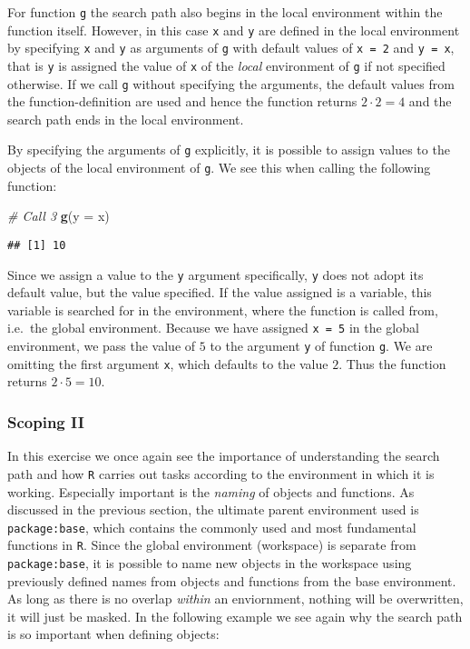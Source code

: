 \documentclass[11,]{article}
\newenvironment{Shaded}{\begin{snugshade}}{\end{snugshade}}
\newcommand{\KeywordTok}[1]{\textcolor[rgb]{0.13,0.29,0.53}{\textbf{{#1}}}}
\newcommand{\DataTypeTok}[1]{\textcolor[rgb]{0.13,0.29,0.53}{{#1}}}
\newcommand{\CommentTok}[1]{\textcolor[rgb]{0.56,0.35,0.01}{\textit{{#1}}}}
\newcommand{\NormalTok}[1]{{#1}}
\begin{document}
For function \texttt{g} the search path also begins in the local
environment within the function itself. However, in this case \texttt{x}
and \texttt{y} are defined in the local environment by specifying
\texttt{x} and \texttt{y} as arguments of \texttt{g} with default values
of \texttt{x\ =\ 2} and \texttt{y\ =\ x}, that is \texttt{y} is assigned
the value of \texttt{x} of the \emph{local} environment of \texttt{g} if
not specified otherwise. If we call \texttt{g} without specifying the
arguments, the default values from the function-definition are used and
hence the function returns \(2 \cdot 2=4\) and the search path ends in
the local environment.

By specifying the arguments of \texttt{g} explicitly, it is possible to
assign values to the objects of the local environment of \texttt{g}. We
see this when calling the following function:

\begin{Shaded}
\begin{Highlighting}[]
\CommentTok{# Call 3}
\KeywordTok{g}\NormalTok{(}\DataTypeTok{y =} \NormalTok{x)}
\end{Highlighting}
\end{Shaded}

\begin{verbatim}
## [1] 10
\end{verbatim}

Since we assign a value to the \texttt{y} argument specifically,
\texttt{y} does not adopt its default value, but the value specified. If
the value assigned is a variable, this variable is searched for in the
environment, where the function is called from, i.e.~the global
environment. Because we have assigned \texttt{x\ =\ 5} in the global
environment, we pass the value of \(5\) to the argument \texttt{y} of
function \texttt{g}. We are omitting the first argument \texttt{x},
which defaults to the value \(2\). Thus the function returns
\(2 \cdot 5=10\).

\subsubsection{Scoping II}\label{scoping-ii}

In this exercise we once again see the importance of understanding the
search path and how \texttt{R} carries out tasks according to the
environment in which it is working. Especially important is the
\emph{naming} of objects and functions. As discussed in the previous
section, the ultimate parent environment used is \texttt{package:base},
which contains the commonly used and most fundamental functions in
\texttt{R}. Since the global environment (workspace) is separate from
\texttt{package:base}, it is possible to name new objects in the
workspace using previously defined names from objects and functions from
the base environment. As long as there is no overlap \emph{within} an
enviornment, nothing will be overwritten, it will just be masked. In the
following example we see again why the search path is so important when
defining objects:
\end{document}
